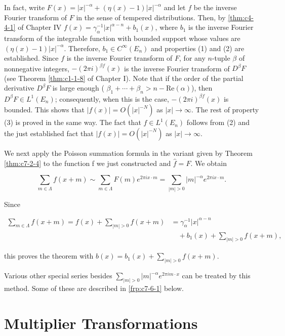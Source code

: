 In fact, write $F(x) = |x|^{-\alpha} + (\eta(x) - 1)|x|^{-\alpha}$ and let $f$ be the inverse Fourier transform of $F$ in the sense of tempered distributions. Then, by \eqref{thm:c4-4-1} of Chapter IV $f(x) = \gamma_{\alpha}^{-1}|x|^{\alpha-n} + b_1(x)$, where $b_1$ is the inverse Fourier transform of the integrable function with bounded support whose values are $(\eta(x) - 1)|x|^{-\alpha}$. Therefore, $b_1 \in C^\infty(E_n)$ and properties (1) and (2) are established. Since $f$ is the inverse Fourier transform of $F$, for any $n$-tuple $\beta$ of nonnegative integers, $-(2\pi i)^{\beta f}(x)$ is the inverse Fourier transform of $D^\beta F$ (see Theorem \ref{thm:c1-1-8} of Chapter I). Note that if the order of the partial derivative $D^\beta F$ is large enough ( $\beta_1 + \cdots + \beta_n > n - \text{Re}(\alpha)$), then $D^\beta F \in L^1(E_n)$; consequently, when this is the case, $-(2\pi i)^{\beta f}(x)$ is bounded. This shows that $|f(x)| = O(|x|^{-N})$ as $|x| \to \infty$. The rest of property (3) is proved in the same way. The fact that $f \in L^1(E_n)$ follows from (2) and the just established fact that $|f(x)| = O(|x|^{-N})$ as $|x| \to \infty$.

We next apply the Poisson summation formula in the variant given by Theorem \ref{thm:c7-2-4} to the function f we just constructed and $\hat{f} = F$. We obtain

\[
\sum_{m\in\Lambda}f(x+m)\sim\sum_{m\in\Lambda}F(m)e^{2\pi i x\cdot m}=\sum_{|m|>0}|m|^{-\alpha}e^{2\pi i x\cdot m}.
\]

Since

\[
\begin{aligned}\sum_{m\in\Lambda}f(x+m)=f(x)+\sum_{|m|>0}f(x+m)&=\gamma_{\alpha}^{-1}\big|x\big|^{\alpha-n}\\&\quad+b_{1}(x)+\sum_{|m|>0}f(x+m),\end{aligned}
\]

this proves the theorem with $b(x) = b_1(x) + \sum_{|m| > 0} f(x + m)$.

Various other special series besides $\sum_{|m|>0}|m|^{-\alpha}e^{2\pi im\cdot x}$ can be treated by this method. Some of these are described in \eqref{frp:c7-6-1} below.

\section{Multiplier Transformations}

